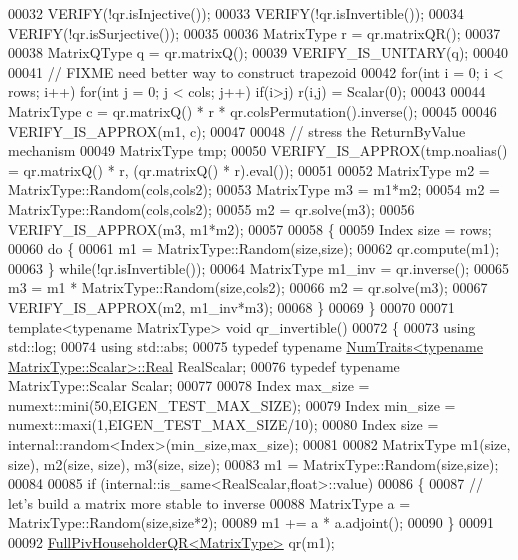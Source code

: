 \begin{DoxyCode}
00032   VERIFY(!qr.isInjective());
00033   VERIFY(!qr.isInvertible());
00034   VERIFY(!qr.isSurjective());
00035 
00036   MatrixType r = qr.matrixQR();
00037   
00038   MatrixQType q = qr.matrixQ();
00039   VERIFY\_IS\_UNITARY(q);
00040   
00041   \textcolor{comment}{// FIXME need better way to construct trapezoid}
00042   \textcolor{keywordflow}{for}(\textcolor{keywordtype}{int} i = 0; i < rows; i++) for(int j = 0; j < cols; j++) if(i>j) r(i,j) = Scalar(0);
00043 
00044   MatrixType c = qr.matrixQ() * r * qr.colsPermutation().inverse();
00045 
00046   VERIFY\_IS\_APPROX(m1, c);
00047   
00048   \textcolor{comment}{// stress the ReturnByValue mechanism}
00049   MatrixType tmp;
00050   VERIFY\_IS\_APPROX(tmp.noalias() = qr.matrixQ() * r, (qr.matrixQ() * r).eval());
00051   
00052   MatrixType m2 = MatrixType::Random(cols,cols2);
00053   MatrixType m3 = m1*m2;
00054   m2 = MatrixType::Random(cols,cols2);
00055   m2 = qr.solve(m3);
00056   VERIFY\_IS\_APPROX(m3, m1*m2);
00057 
00058   \{
00059     Index size = rows;
00060     \textcolor{keywordflow}{do} \{
00061       m1 = MatrixType::Random(size,size);
00062       qr.compute(m1);
00063     \} \textcolor{keywordflow}{while}(!qr.isInvertible());
00064     MatrixType m1\_inv = qr.inverse();
00065     m3 = m1 * MatrixType::Random(size,cols2);
00066     m2 = qr.solve(m3);
00067     VERIFY\_IS\_APPROX(m2, m1\_inv*m3);
00068   \}
00069 \}
00070 
00071 \textcolor{keyword}{template}<\textcolor{keyword}{typename} MatrixType> \textcolor{keywordtype}{void} qr\_invertible()
00072 \{
00073   \textcolor{keyword}{using} std::log;
00074   \textcolor{keyword}{using} std::abs;
00075   \textcolor{keyword}{typedef} \textcolor{keyword}{typename} \hyperlink{group___core___module_struct_eigen_1_1_num_traits}{NumTraits<typename MatrixType::Scalar>::Real}
       RealScalar;
00076   \textcolor{keyword}{typedef} \textcolor{keyword}{typename} MatrixType::Scalar Scalar;
00077 
00078   Index max\_size = numext::mini(50,EIGEN\_TEST\_MAX\_SIZE);
00079   Index min\_size = numext::maxi(1,EIGEN\_TEST\_MAX\_SIZE/10);
00080   Index size = internal::random<Index>(min\_size,max\_size);
00081 
00082   MatrixType m1(size, size), m2(size, size), m3(size, size);
00083   m1 = MatrixType::Random(size,size);
00084 
00085   \textcolor{keywordflow}{if} (internal::is\_same<RealScalar,float>::value)
00086   \{
00087     \textcolor{comment}{// let's build a matrix more stable to inverse}
00088     MatrixType a = MatrixType::Random(size,size*2);
00089     m1 += a * a.adjoint();
00090   \}
00091 
00092   \hyperlink{group___q_r___module}{FullPivHouseholderQR<MatrixType>} qr(m1);

\end{DoxyCode}
